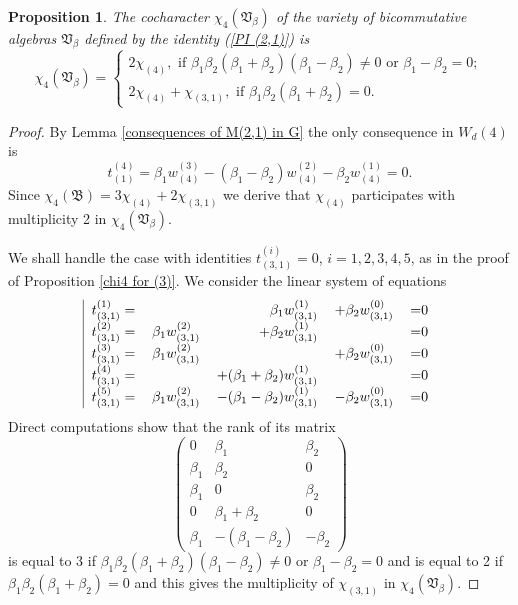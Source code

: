 \documentclass{amsart}
\newtheorem{proposition}[theorem]{Proposition}
\theoremstyle{definition}
\begin{document}
\begin{proposition}\label{chi4 for (2,1)}
The cocharacter $\chi_4({\mathfrak V}_{\beta})$ of the variety of bicommutative algebras ${\mathfrak V}_{\beta}$ defined by the identity {\rm (\ref{PI (2,1)})} is
\[
\chi_4({\mathfrak V}_{\beta})=\begin{cases}
2\chi_{(4)},\text{ if }\beta_1\beta_2(\beta_1+\beta_2)(\beta_1-\beta_2)\not=0\text{ or }\beta_1-\beta_2=0;\\
2\chi_{(4)}+\chi_{(3,1)},\text{ if }\beta_1\beta_2(\beta_1+\beta_2)=0.
\end{cases}
\]
\end{proposition}

\begin{proof}
By Lemma \ref{consequences of M(2,1) in G} the only consequence in $W_d(4)$ is
\[
t^{(4)}_{(1)}=\beta_1w_{(4)}^{(3)}-(\beta_1-\beta_2)w_{(4)}^{(2)}-\beta_2w_{(4)}^{(1)}=0.
\]
Since $\chi_4({\mathfrak B})=3\chi_{(4)}+2\chi_{(3,1)}$ we derive that $\chi_{(4)}$ participates with multiplicity 2 in $\chi_4({\mathfrak V}_{\beta})$.

We shall handle the case with identities $t^{(i)}_{(3,1)}=0$, $i=1,2,3,4,5$, as in the proof of Proposition \ref{chi4 for (3)}. We consider the linear system of equations
\begin{equation}
\text{
\begin{tabular}{|rrrrl}\label{identities from (2,1) to (3,1)}
$t^{(1)}_{(3,1)}=$&&$\beta_1w_{(3,1)}^{(1)}$&$+\beta_2w_{(3,1)}^{(0)}$&=0\\
$t^{(2)}_{(3,1)}=$&$\beta_1w_{(3,1)}^{(2)}$&$+\beta_2w_{(3,1)}^{(1)}$&&=0\\
$t^{(3)}_{(3,1)}=$&$\beta_1w_{(3,1)}^{(2)}$&&$+\beta_2w_{(3,1)}^{(0)}$&=0\\
$t^{(4)}_{(3,1)}=$&$$&$+(\beta_1+\beta_2)w_{(3,1)}^{(1)}$&$$&=0\\
$t^{(5)}_{(3,1)}=$&$\beta_1w_{(3,1)}^{(2)}$&$-(\beta_1-\beta_2)w_{(3,1)}^{(1)}$&$-\beta_2w_{(3,1)}^{(0)}$&=0\\
\end{tabular}
}
\end{equation}
Direct computations show that the rank of its matrix
\[
\left(\begin{matrix}
0&\beta_1&\beta_2\\
\beta_1&\beta_2&0\\
\beta_1&0&\beta_2\\
0&\beta_1+\beta_2&0\\
\beta_1&-(\beta_1-\beta_2)&-\beta_2
\end{matrix}\right)
\]
is equal to 3 if $\beta_1\beta_2(\beta_1+\beta_2)(\beta_1-\beta_2)\not=0$ or $\beta_1-\beta_2=0$ and
is equal to 2 if $\beta_1\beta_2(\beta_1+\beta_2)=0$ and this gives the multiplicity of $\chi_{(3,1)}$ in $\chi_4({\mathfrak V}_{\beta})$.
\end{proof}
\end{document}
